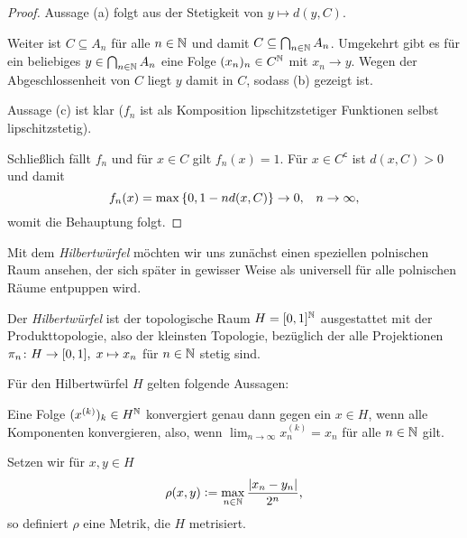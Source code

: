 \documentclass[../main/main.tex]{subfiles}
\begin{document}
	\begin{proof}
		Aussage (a) folgt aus der Stetigkeit von $y \mapsto d(y, C)$.
		
		Weiter ist $C \subseteq A_n$ für alle $n \in \mathbb{N}$ und damit 
		$C \subseteq \bigcap_{n \in \mathbb{N}} A_n$. 
		Umgekehrt gibt es für ein beliebiges $y \in \bigcap_{n \in \mathbb{N}} A_n$
		eine Folge $(x_n)_n \in C^{\mathbb{N}}$ mit $x_n \rightarrow y$. 
		Wegen der Abgeschlossenheit von $C$ liegt $y$ damit in $C$, sodass (b) gezeigt ist.
		
		Aussage (c) ist klar ($f_n$ ist als Komposition 
		lipschitzstetiger Funktionen selbst lipschitzstetig).
		
		Schließlich fällt $f_n$ und für $x \in C$ gilt $f_n(x) = 1$. 
		Für $x \in C^\mathsf{c}$ ist $d(x, C) > 0$ und damit
		$$f_n(x) = \max \left\{0, 1-n d(x, C)\right\} 
		\to 0 \text{,} \quad n \to \infty \text{,}$$
		womit die Behauptung folgt.
	\end{proof}

	Mit dem \emph{Hilbertwürfel} möchten wir uns zunächst einen speziellen polnischen Raum ansehen, 
	der sich später in gewisser Weise als universell für alle polnischen Räume entpuppen wird.

	\begin{Definition}[Hilbertwürfel]
		Der \emph{Hilbertwürfel} ist der topologische Raum $H = [0, 1]^{\mathbb{N}}$ 
		ausgestattet mit der Produkttopologie, also der kleinsten Topologie, 
		bezüglich der alle Projektionen $\pi_n \colon H \to [0, 1], \; x \mapsto x_n $ 
		für $n \in \mathbb{N}$ stetig sind.
	\end{Definition}
	
	\begin{Hilfssatz}
		\label{lem:hilbertcube}
		Für den Hilbertwürfel $H$ gelten folgende Aussagen:
		\begin{enumeratethm}
			\item Eine Folge $(x^{(k)})_k \in H^{\mathbb{N}}$ konvergiert genau dann gegen 
			ein $x \in H$, wenn alle Komponenten konvergieren, also, wenn
			$\lim_{n \to \infty} x_n^{(k)} = x_n$ für alle $n \in \mathbb{N}$ gilt.
			\item Setzen wir für $x, y \in H$
			$$\rho(x, y) \vcentcolon = \max_{n \in \mathbb{N}} \frac{|x_n - y_n|}{2^n} \text{,}$$
			so definiert $\rho$ eine Metrik, die $H$ metrisiert.
		\end{enumeratethm}
	\end{Hilfssatz}
	
\end{document}
